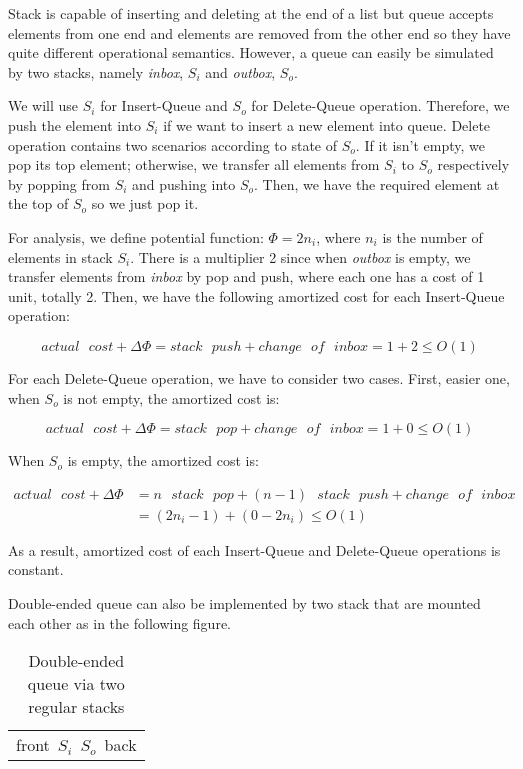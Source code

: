 Stack is capable of inserting and deleting at the end of a list but queue accepts elements from one end and elements are removed from the other end so they have quite different operational semantics. However, a queue can easily be simulated by two stacks, namely \textit{inbox}, $S_{i}$ and \textit{outbox}, $S_{o}$.

We will use $S_{i}$ for Insert-Queue and $S_{o}$ for Delete-Queue operation. Therefore, we push the element into $S_{i}$ if we want to insert a new element into queue. Delete operation contains two scenarios according to state of $S_{o}$. If it isn't empty, we pop its top element; otherwise, we transfer all elements from $S_{i}$ to $S_{o}$ respectively by popping from $S_{i}$ and pushing into $S_{o}$. Then, we have the required element at the top of $S_{o}$ so we just pop it.

For analysis, we define potential function: $\Phi = 2n_{i}$, where $n_{i}$ is the number of elements in stack $S_{i}$. There is a multiplier 2 since when \textit{outbox} is empty, we transfer elements from \textit{inbox} by pop and push, where each one has a cost of 1 unit, totally 2. Then, we have the following amortized cost for each Insert-Queue operation:

$$
	actual\text{ }cost + \Delta\Phi = stack\text{ }push + change\text{ }of\text{ }inbox = 1 + 2 \leq O(1)
$$

For each Delete-Queue operation, we have to consider two cases. First, easier one, when $S_{o}$ is not empty, the amortized cost is:

$$
	actual\text{ }cost + \Delta\Phi = stack\text{ }pop + change\text{ }of\text{ }inbox = 1 + 0 \leq O(1)
$$

When $S_{o}$ is empty, the amortized cost is:

\begin{align*}
	actual\text{ }cost + \Delta\Phi &=  n\text{ }stack\text{ }pop + (n-1)\text{ }stack\text{ }push + change\text{ }of\text{ }inbox \\
	&= (2n_{i} - 1) + (0 - 2n_{i}) \leq O(1)
\end{align*}

As a result, amortized cost of each Insert-Queue and Delete-Queue operations is constant.

Double-ended queue can also be implemented by two stack that are mounted each other as in the following figure.

\begin{table}[ht]
\begin{center}
\begin{tabular}{p{5cm}||p{5cm}}
  \hline  
  & \\
  \hline
  \multicolumn{2}{p{8cm}}{ \hbox{front \hspace{2cm} $S_{i}$  \hspace{4cm} $S_{o}$ \hspace{2cm} back}} \\
\end{tabular}
\caption{Double-ended queue via two regular stacks}
\end{center}
\end{table}

